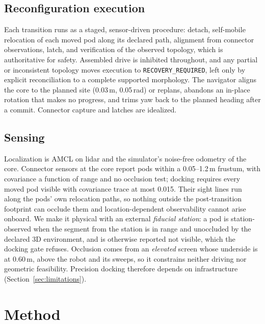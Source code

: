 \documentclass[conference]{IEEEtran}
\begin{document}
\subsection{Reconfiguration execution}
Each transition runs as a staged, sensor-driven procedure: detach, self-mobile relocation of each moved pod along its declared path, alignment from connector observations, latch, and verification of the observed topology, which is authoritative for safety. Assembled drive is inhibited throughout, and any partial or inconsistent topology moves execution to \texttt{RECOVERY\_REQUIRED}, left only by explicit reconciliation to a complete supported morphology. The navigator aligns the core to the planned site (0.03\,m, 0.05\,rad) or replans, abandons an in-place rotation that makes no progress, and trims yaw back to the planned heading after a commit. Connector capture and latches are idealized.

\subsection{Sensing}
Localization is AMCL on lidar and the simulator's noise-free odometry of the core. Connector sensors at the core report pods within a 0.05--1.2\,m frustum, with covariance a function of range and no occlusion test; docking requires every moved pod visible with covariance trace at most 0.015. Their sight lines run along the pods' own relocation paths, so nothing outside the post-transition footprint can occlude them and location-dependent observability cannot arise onboard. We make it physical with an external \emph{fiducial station}: a pod is station-observed when the segment from the station is in range and unoccluded by the declared 3D environment, and is otherwise reported not visible, which the docking gate refuses. Occlusion comes from an \emph{elevated} screen whose underside is at 0.60\,m, above the robot and its sweeps, so it constrains neither driving nor geometric feasibility. Precision docking therefore depends on infrastructure (Section~\ref{sec:limitations}).


\section{Method}
\end{document}
